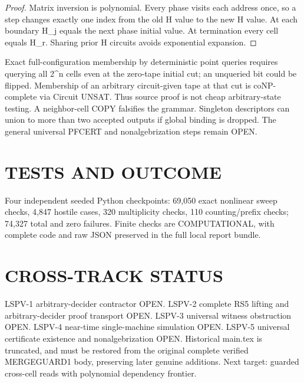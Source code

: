 \documentclass{article}
\begin{document}
\begin{proof}
Matrix inversion is polynomial. Every phase visits each address once, so a step changes exactly one index from the old H value to the new H value. At each boundary H_j equals the next phase initial value. At termination every cell equals H_r. Sharing prior H circuits avoids exponential expansion.
\end{proof}
Exact full-configuration membership by deterministic point queries requires querying all 2^n cells even at the zero-tape initial cut; an unqueried bit could be flipped. Membership of an arbitrary circuit-given tape at that cut is coNP-complete via Circuit UNSAT. Thus source proof is not cheap arbitrary-state testing. A neighbor-cell COPY falsifies the grammar. Singleton descriptors can union to more than two accepted outputs if global binding is dropped. The general universal PFCERT and nonalgebrization steps remain OPEN.
\section{TESTS AND OUTCOME}
Four independent seeded Python checkpoints: 69,050 exact nonlinear sweep checks, 4,847 hostile cases, 320 multiplicity checks, 110 counting/prefix checks; 74,327 total and zero failures. Finite checks are COMPUTATIONAL, with complete code and raw JSON preserved in the full local report bundle.
\section{CROSS-TRACK STATUS}
LSPV-1 arbitrary-decider contractor OPEN. LSPV-2 complete RS5 lifting and arbitrary-decider proof transport OPEN. LSPV-3 universal witness obstruction OPEN. LSPV-4 near-time single-machine simulation OPEN. LSPV-5 universal certificate existence and nonalgebrization OPEN. Historical main.tex is truncated, and must be restored from the original complete verified MERGEGUARD1 body, preserving later genuine additions. Next target: guarded cross-cell reads with polynomial dependency frontier.
\end{document}
